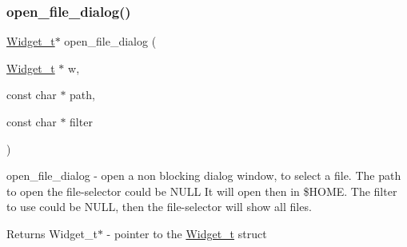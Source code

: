 \subsubsection{\texorpdfstring{open\+\_\+file\+\_\+dialog()}{open\_file\_dialog()}}
{\footnotesize\ttfamily \hyperlink{structWidget__t}{Widget\+\_\+t}$\ast$ open\+\_\+file\+\_\+dialog (\begin{DoxyParamCaption}\item[{\hyperlink{structWidget__t}{Widget\+\_\+t} $\ast$}]{w,  }\item[{const char $\ast$}]{path,  }\item[{const char $\ast$}]{filter }\end{DoxyParamCaption})}



open\+\_\+file\+\_\+dialog -\/ open a non blocking dialog window, to select a file. The path to open the file-\/selector could be N\+U\+LL It will open then in \$\+H\+O\+ME. The filter to use could be N\+U\+LL, then the file-\/selector will show all files. 

\begin{DoxyReturn}{Returns}
Widget\+\_\+t$\ast$ -\/ pointer to the \hyperlink{structWidget__t}{Widget\+\_\+t} struct 
\end{DoxyReturn}
